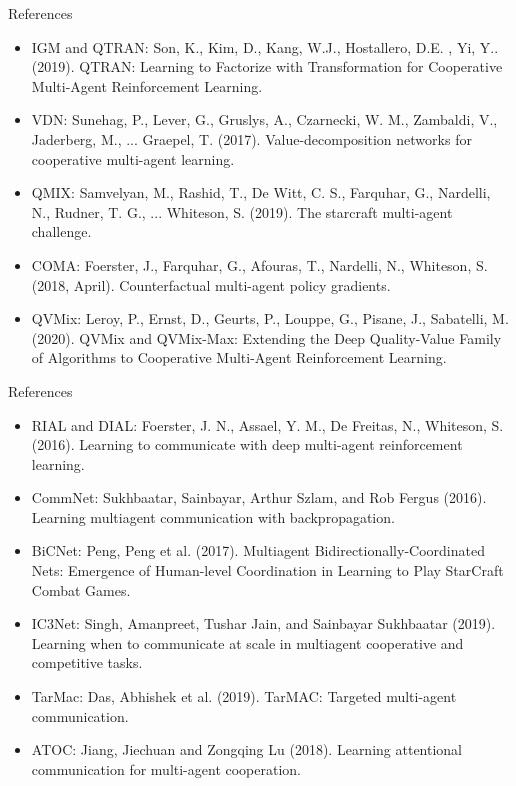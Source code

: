 \documentclass[9pt, hyperref={pdfusetitle,colorlinks=true,allcolors=DarkBlue}]{beamer}
\begin{document}
\begin{frame}{References}
\begin{itemize}
    \item  IGM and QTRAN: Son, K., Kim, D., Kang, W.J., Hostallero, D.E. , Yi, Y.. (2019). QTRAN: Learning to Factorize with Transformation for Cooperative Multi-Agent Reinforcement Learning.
    \item VDN: Sunehag, P., Lever, G., Gruslys, A., Czarnecki, W. M., Zambaldi, V., Jaderberg, M., ...  Graepel, T. (2017). Value-decomposition networks for cooperative multi-agent learning.
    \item QMIX: Samvelyan, M., Rashid, T., De Witt, C. S., Farquhar, G., Nardelli, N., Rudner, T. G., ...  Whiteson, S. (2019). The starcraft multi-agent challenge.
    \item COMA: Foerster, J., Farquhar, G., Afouras, T., Nardelli, N.,  Whiteson, S. (2018, April). Counterfactual multi-agent policy gradients. 
    \item QVMix: Leroy, P., Ernst, D., Geurts, P., Louppe, G., Pisane, J.,  Sabatelli, M. (2020). QVMix and QVMix-Max: Extending the Deep Quality-Value Family of Algorithms to Cooperative Multi-Agent Reinforcement Learning. 
\end{itemize}
\end{frame}
\begin{frame}{References}
    \begin{itemize}
    \item RIAL and DIAL: Foerster, J. N., Assael, Y. M., De Freitas, N., Whiteson, S. (2016). Learning to communicate with deep multi-agent reinforcement learning.
    
    \item CommNet: Sukhbaatar, Sainbayar, Arthur Szlam, and Rob Fergus (2016). Learning multiagent communication with backpropagation.
    \item BiCNet: Peng, Peng et al. (2017). Multiagent Bidirectionally-Coordinated Nets: Emergence of Human-level Coordination in Learning to Play StarCraft Combat Games.
    \item IC3Net: Singh, Amanpreet, Tushar Jain, and Sainbayar Sukhbaatar (2019). Learning when to communicate at scale in multiagent cooperative and competitive tasks.
    \item TarMac: Das, Abhishek et al. (2019). TarMAC: Targeted multi-agent communication.
    \item ATOC: Jiang, Jiechuan and Zongqing Lu (2018). Learning attentional communication for multi-agent cooperation.
    \end{itemize}
\end{frame}
\end{document}
